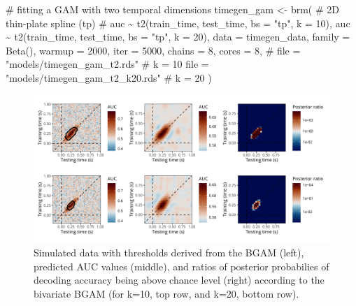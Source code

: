 \documentclass[
  doc,
  floatsintext,
  longtable,
  a4paper,
  nolmodern,
  notxfonts,
  notimes,
  donotrepeattitle,
  colorlinks=true,linkcolor=blue,citecolor=blue,urlcolor=blue]{apa7}
\newenvironment{Shaded}{\begin{snugshade}}{\end{snugshade}}
\newcommand{\AttributeTok}[1]{\textcolor[rgb]{0.40,0.45,0.13}{#1}}
\newcommand{\CommentTok}[1]{\textcolor[rgb]{0.37,0.37,0.37}{#1}}
\newcommand{\DecValTok}[1]{\textcolor[rgb]{0.68,0.00,0.00}{#1}}
\newcommand{\FunctionTok}[1]{\textcolor[rgb]{0.28,0.35,0.67}{#1}}
\newcommand{\NormalTok}[1]{\textcolor[rgb]{0.00,0.23,0.31}{#1}}
\newcommand{\OtherTok}[1]{\textcolor[rgb]{0.00,0.23,0.31}{#1}}
\newcommand{\SpecialCharTok}[1]{\textcolor[rgb]{0.37,0.37,0.37}{#1}}
\newcommand{\StringTok}[1]{\textcolor[rgb]{0.13,0.47,0.30}{#1}}
\begin{document}
\begin{Shaded}
\begin{Highlighting}[]
\CommentTok{\# fitting a GAM with two temporal dimensions}
\NormalTok{timegen\_gam }\OtherTok{\textless{}{-}} \FunctionTok{brm}\NormalTok{(}
    \CommentTok{\# 2D thin{-}plate spline (tp)}
    \CommentTok{\# auc \textasciitilde{} t2(train\_time, test\_time, bs = "tp", k = 10),}
\NormalTok{    auc }\SpecialCharTok{\textasciitilde{}} \FunctionTok{t2}\NormalTok{(train\_time, test\_time, }\AttributeTok{bs =} \StringTok{"tp"}\NormalTok{, }\AttributeTok{k =} \DecValTok{20}\NormalTok{),}
    \AttributeTok{data =}\NormalTok{ timegen\_data,}
    \AttributeTok{family =} \FunctionTok{Beta}\NormalTok{(),}
    \AttributeTok{warmup =} \DecValTok{2000}\NormalTok{,}
    \AttributeTok{iter =} \DecValTok{5000}\NormalTok{,}
    \AttributeTok{chains =} \DecValTok{8}\NormalTok{,}
    \AttributeTok{cores =} \DecValTok{8}\NormalTok{,}
    \CommentTok{\# file = "models/timegen\_gam\_t2.rds" \# k = 10}
    \AttributeTok{file =} \StringTok{"models/timegen\_gam\_t2\_k20.rds"} \CommentTok{\# k = 20}
\NormalTok{    )}
\end{Highlighting}
\end{Shaded}

\begin{figure}[H]

\caption{Simulated data with thresholds derived from the BGAM (left),
predicted AUC values (middle), and ratios of posterior probabilies of
decoding accuracy being above chance level (right) according to the
bivariate BGAM (for k=10, top row, and k=20, bottom row).}

{\centering \includegraphics[width=1\textwidth,height=\textheight]{brms_meeg_files/figure-pdf/gam-timegen-post-preds-1.png}

}

\end{figure}%
\end{document}
